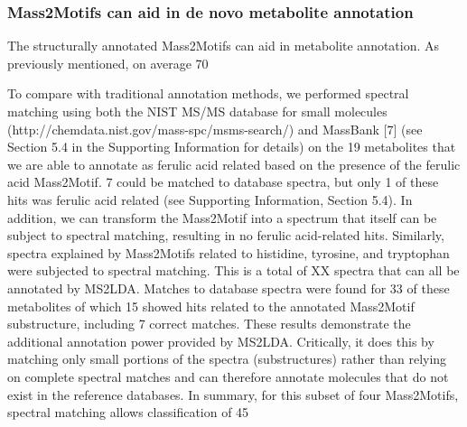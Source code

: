 \subsubsection{Mass2Motifs can aid in de novo metabolite annotation}

The structurally annotated Mass2Motifs can aid in metabolite annotation. As previously mentioned, on average 70%

To compare with traditional annotation methods, we performed spectral matching using both the NIST MS/MS database for small molecules (http://chemdata.nist.gov/mass-spc/msms-search/) and MassBank [7] (see Section 5.4 in the Supporting Information for details) on the 19 metabolites that we are able to annotate as ferulic acid related based on the presence of the ferulic acid Mass2Motif. 7 could be matched to database spectra, but only 1 of these hits was ferulic acid related (see Supporting Information, Section 5.4). In addition, we can transform the Mass2Motif into a spectrum that itself can be subject to spectral matching, resulting in  no ferulic acid-related hits. Similarly, spectra explained by Mass2Motifs related to histidine, tyrosine, and tryptophan were subjected to spectral matching. This is a total of XX spectra that can all be annotated by MS2LDA. Matches to database spectra were found for 33 of these metabolites of which 15 showed hits related to the annotated Mass2Motif substructure, including 7 correct matches. These results demonstrate the additional annotation power provided by MS2LDA. Critically, it does this by matching only small portions of the spectra (substructures) rather than relying on complete spectral matches and can therefore annotate molecules that do not exist in the reference databases. In summary, for this subset of four Mass2Motifs, spectral matching allows classification of 45%

